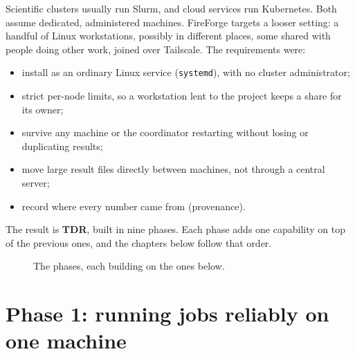 \documentclass[11pt,a4paper]{report}
\newcommand{\code}[1]{\texttt{#1}}
\begin{document}
Scientific clusters usually run Slurm, and cloud services run Kubernetes. Both assume dedicated,
administered machines. FireForge targets a looser setting: a handful of Linux workstations,
possibly in different places, some shared with people doing other work, joined over Tailscale.
The requirements were:
\begin{itemize}
\item install as an ordinary Linux service (\code{systemd}), with no cluster administrator;
\item strict per-node limits, so a workstation lent to the project keeps a share for its owner;
\item survive any machine or the coordinator restarting without losing or duplicating results;
\item move large result files directly between machines, not through a central server;
\item record where every number came from (provenance).
\end{itemize}
The result is \textbf{TDR}, built in nine phases. Each phase adds one capability on top of the
previous ones, and the chapters below follow that order.

\begin{figure}[h]
\centering
{}
\caption{The phases, each building on the ones below.}
\end{figure}

\chapter{Phase 1: running jobs reliably on one machine}
\end{document}
